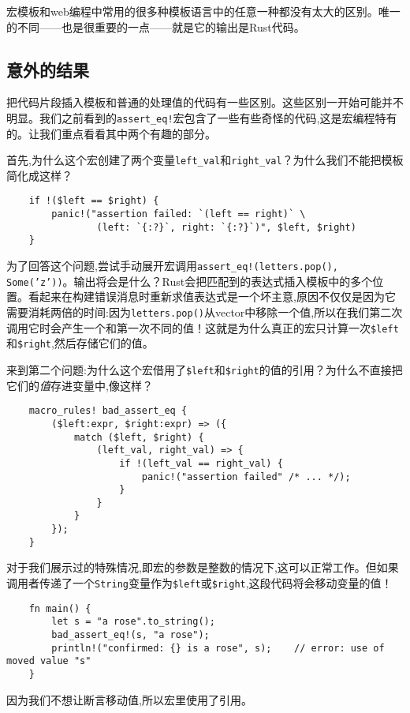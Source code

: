 宏模板和web编程中常用的很多种模板语言中的任意一种都没有太大的区别。唯一的不同——也是很重要的一点——就是它的输出是Rust代码。

\subsection{意外的结果}
把代码片段插入模板和普通的处理值的代码有一些区别。这些区别一开始可能并不明显。我们之前看到的\texttt{assert\_eq!}宏包含了一些有些奇怪的代码,这是宏编程特有的。让我们重点看看其中两个有趣的部分。

首先,为什么这个宏创建了两个变量\texttt{left\_val}和\texttt{right\_val}？为什么我们不能把模板简化成这样？
\begin{verbatim}
    if !($left == $right) {
        panic!("assertion failed: `(left == right)` \
                (left: `{:?}`, right: `{:?}`)", $left, $right)
    }
\end{verbatim}
为了回答这个问题,尝试手动展开宏调用\texttt{assert\_eq!(letters.pop(), Some('z'))}。输出将会是什么？Rust会把匹配到的表达式插入模板中的多个位置。看起来在构建错误消息时重新求值表达式是一个坏主意,原因不仅仅是因为它需要消耗两倍的时间:因为\texttt{letters.pop()}从vector中移除一个值,所以在我们第二次调用它时会产生一个和第一次不同的值！这就是为什么真正的宏只计算一次\texttt{\$left}和\texttt{\$right},然后存储它们的值。

来到第二个问题:为什么这个宏借用了\texttt{\$left}和\texttt{\$right}的值的引用？为什么不直接把它们的\emph{值}存进变量中,像这样？
\begin{verbatim}
    macro_rules! bad_assert_eq {
        ($left:expr, $right:expr) => ({
            match ($left, $right) {
                (left_val, right_val) => {
                    if !(left_val == right_val) {
                        panic!("assertion failed" /* ... */);
                    }
                }
            }
        });
    }
\end{verbatim}

对于我们展示过的特殊情况,即宏的参数是整数的情况下,这可以正常工作。但如果调用者传递了一个\texttt{String}变量作为\texttt{\$left}或\texttt{\$right},这段代码将会移动变量的值！
\begin{verbatim}
    fn main() {
        let s = "a rose".to_string();
        bad_assert_eq!(s, "a rose");
        println!("confirmed: {} is a rose", s);    // error: use of moved value "s"
    }
\end{verbatim}

因为我们不想让断言移动值,所以宏里使用了引用。

